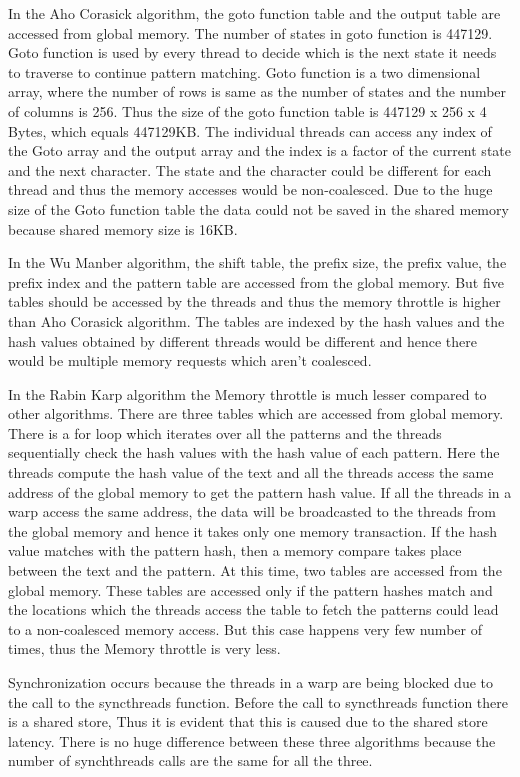 In the Aho Corasick algorithm, the goto function table and the output table are accessed from global memory. The number of states in goto function is 447129. Goto function is used by every thread to decide which is the next state it needs to traverse to continue pattern matching. Goto function is a two dimensional array, where the number of rows is same as the number of states and the number of columns is 256. Thus the size of the goto function table is 447129 x 256 x 4 Bytes, which equals 447129KB. The individual threads can access any index of the Goto array and the output array and the index is a factor of the current state and the next character. The state and the character could be different for each thread and thus the memory accesses would be non-coalesced. Due to the huge size of the Goto function table the data could not be saved in the shared memory because shared memory size is 16KB. 

In the Wu Manber algorithm, the shift table, the prefix size, the prefix value, the prefix index and the pattern table are accessed from the global memory. But five tables should be accessed by the threads and thus the memory throttle is higher than Aho Corasick algorithm. The tables are indexed by the hash values and the hash values obtained by different threads would be different and hence there would be multiple memory requests which aren’t coalesced. 

In the Rabin Karp algorithm the Memory throttle is much lesser compared to other algorithms. There are three tables which are accessed from global memory. There is a for loop which iterates over all the patterns and the threads sequentially check the hash values with the hash value of each pattern. Here the threads compute the hash value of the text and all the threads access the same address of the global memory to get the pattern hash value. If all the threads in a warp access the same address, the data will be broadcasted to the threads from the global memory and hence it takes only one memory transaction. If the hash value matches with the pattern hash, then a memory compare takes place between the text and the pattern. At this time, two tables are accessed from the global memory. These tables are accessed only if the pattern hashes match and the locations which the threads access the table to fetch the patterns could lead to a non-coalesced memory access. But this case happens very few number of times, thus the Memory throttle is very less.

Synchronization occurs because the threads in a warp are being blocked due to the call to the syncthreads function. Before the call to syncthreads function there is a shared store, Thus it is evident that this is caused due to the shared store latency.  There is no huge difference between these three algorithms because the number of synchthreads calls are the same for all the three.

